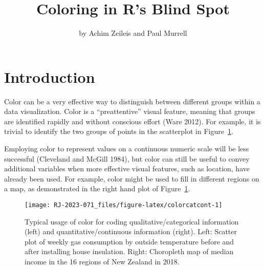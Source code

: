 \title{Coloring in R's Blind Spot}


\author{by Achim Zeileis and Paul Murrell}

\maketitle


\hypertarget{introduction}{%
\section{Introduction}\label{introduction}}

Color can be a very effective way to distinguish between different groups
within a data visualization. Color is a ``preattentive'' visual feature,
meaning that groups are identified rapidly and without conscious effort
(Ware 2012). For example, it is trivial to identify the
two groups of points in the scatterplot in Figure~\ref{fig:colorcatcont}.

Employing color to represent values on a continuous numeric scale will be
less successful (Cleveland and McGill 1984), but color can
still be useful to convey additional variables when more effective
visual features, such as location, have already been used. For example,
color might be used to fill in different regions on a map, as
demonstrated in the right hand plot of Figure~\ref{fig:colorcatcont}.

\begin{figure}[h!]

{\centering \texttt{[image: RJ-2023-071\_files/figure-latex/colorcatcont-1]} 

}

\caption{Typical usage of color for coding qualitative/categorical information (left) and quantitative/continuous information (right). Left: Scatter plot of weekly gas consumption by outside temperature before and after installing house insulation. Right: Choropleth map of median income in the 16 regions of New Zealand in 2018.}\label{fig:colorcatcont}
\end{figure}

